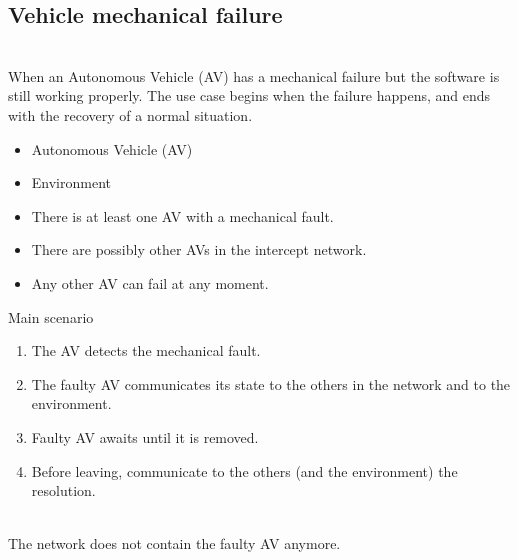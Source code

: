 \documentclass{memoir}
\begin{document}
\subsection{Vehicle mechanical failure}
\begin{description}
	\addtolength{\itemindent}{0.5cm}
	\item[Brief Description] \hfill \\
	When an Autonomous Vehicle (AV) has a mechanical failure but the software is still working properly. The use case begins when the failure happens, and ends with the recovery of a normal situation.
	
	\item[Actors] \hfill
	\begin{itemize}
		\item Autonomous Vehicle (AV)
		\item Environment
	\end{itemize}
	
	\item[Preconditions] \hfill
	\begin{itemize}
		\item There is at least one AV with a mechanical fault.
		\item There are possibly other AVs in the intercept network.
		\item Any other AV can fail at any moment.
	\end{itemize}
	
	\item[Scenarios] \hfill
	\begin{description}
		\item Main scenario
		\begin{enumerate}
			\item The AV detects the mechanical fault.
			\item The faulty AV communicates its state to the others in the network and to the environment.
			\item Faulty AV awaits until it is removed.
			\item Before leaving, communicate to the others (and the environment) the resolution.
		\end{enumerate}
	\end{description}
	
	\item[Postconditions] \hfill \\
	The network does not contain the faulty AV anymore.
\end{description}
\end{document}
